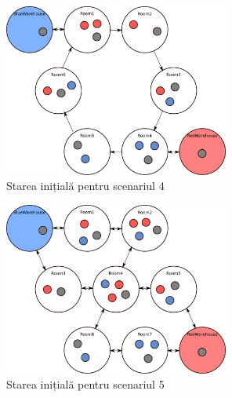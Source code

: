 \documentclass[12pt]{article}
\begin{document}
\begin{figure}[h!]
  \centering
  \includegraphics[width=0.66\textwidth]{graphics/scenario4.pdf}
  \caption{Starea inițială pentru scenariul 4}
  \label{fig:s4}
\end{figure}

\begin{figure}[h!]
  \centering
  \includegraphics[width=0.66\textwidth]{graphics/scenario5.pdf}
  \caption{Starea inițială pentru scenariul 5}
  \label{fig:s5}
\end{figure}
\end{document}
